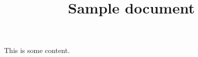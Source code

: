 \documentclass{mszarticle}
\title{Sample document}
\begin{document}
\maketitle
This is some content.
\end{document}
